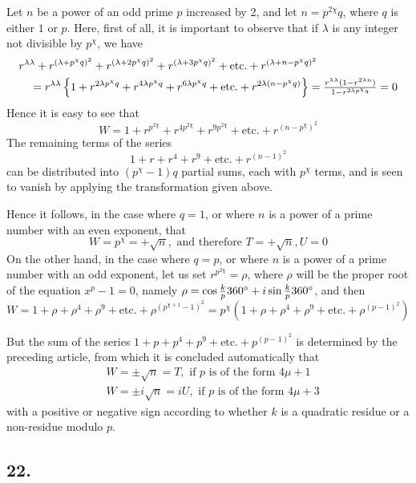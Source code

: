 \documentclass[twoside,12pt]{memoir}
\let\oldfrac\frac
\def\frac#1#2{\mathchoice{\tfrac{#1}{#2}}{\oldfrac{#1}{#2}}{\genfrac{}{}{}{2}{#1}{#2\mathstrut}}{\genfrac{}{}{}{3}{#1}{#2\mathstrut}}}
\begin{document}
Let \(n\) be a power of an odd prime \(p\) increased by 2, and let \(n = p^{2 \chi} q\), where \(q\) is either \(1\) or \(p\). Here, first of all, it is important to observe that if \(\lambda\) is any integer not divisible by \(p^{\chi}\), we have
\[\begin{aligned}
& r^{\lambda \lambda}+r^{(\lambda+p^{\chi} q)^{2}}+r^{(\lambda+2 p^{\chi} q)^{2}}+r^{(\lambda+3 p^{\chi} q)^{2}}+\text{etc{.}}+r^{(\lambda+n-p^{\chi} q)^{2}} \\
& \quad=r^{\lambda \lambda}\left\{1+r^{2 \lambda p^{\chi} q}+r^{4 \lambda p^{\chi} q}+r^{6 \lambda p^{\chi} q}+\text{etc{.}}+r^{2 \lambda(n-p^{\chi} q)}\right\}=\frac{r^{\lambda \lambda}(1-r^{2 \lambda n})}{1-r^{2 \lambda p^{\chi} q}}=0
\end{aligned}\]
Hence it is easy to see that
\[W=1+r^{p^{2 \chi}}+r^{4 p^{2 \chi}}+r^{9 p^{2 \chi}}+\text{etc{.}}+r^{(n-p^{\chi})^{2}}\]
The remaining terms of the series
\[1+r+r^{4}+r^{9}+\text{etc{.}}+r^{(n-1)^{2}}\]
can be distributed into \((p^{\chi}-1) q\) partial sums, each with \(p^{\chi}\) terms, and is seen to vanish by applying the transformation given above.
%

Hence it follows, in the case where \(q=1\), or where \(n\) is a power of a prime number with an even exponent, that
\[W=p^{\chi}=+\sqrt{n}, \text{ and therefore } T=+\sqrt{n}, U=0\]
On the other hand, in the case where \(q=p\), or where \(n\) is a power of a prime number with an odd exponent, let us set \(r^{p^{2\chi}}=\rho\), where \(\rho\) will be the proper root of the equation \(x^{p}-1=0\), namely \(\rho=\cos \frac{k}{p} 360^{\circ}+i \sin \frac{k}{p} 360^{\circ}\), and then
\[W=1+\rho+\rho^{4}+\rho^{9}+\text{etc{.}}+\rho^{(p^{\chi+1}-1)^{2}}=p^{\chi}(1+\rho+\rho^{4}+\rho^{9}+\text{etc{.}}+\rho^{(p-1)^{2}})\]
%

But the sum of the series \(1+p+p^{4}+p^{9}+\text{etc.}+p^{(p-1)^{2}}\) is determined by the preceding article, from which it is concluded automatically that
\[\begin{aligned}
& W= \pm \sqrt{n}=T, \text{ if } p \text{ is of the form } 4 \mu+1 \\
& W= \pm i \sqrt{n}=i U, \text{ if } p \text{ is of the form } 4 \mu+3
\end{aligned}\]
with a positive or negative sign according to whether \(k\) is a quadratic residue or a non-residue modulo \(p\).
%

\subsection*{22.}
\end{document}
